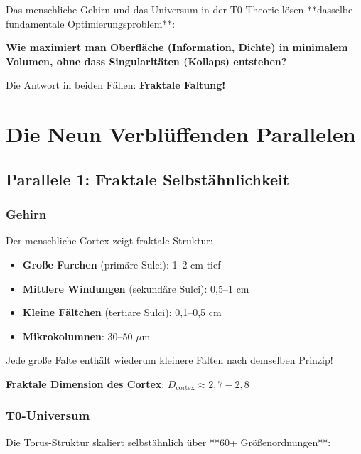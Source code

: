 	\begin{important}
		Das menschliche Gehirn und das Universum in der T0-Theorie lösen **dasselbe fundamentale Optimierungsproblem**:
		
		\vspace{0.3cm}
		
		\textbf{Wie maximiert man Oberfläche (Information, Dichte) in minimalem Volumen, ohne dass Singularitäten (Kollaps) entstehen?}
		
		\vspace{0.3cm}
		
		Die Antwort in beiden Fällen: \textbf{Fraktale Faltung!}
	\end{important}
	
	\section{Die Neun Verblüffenden Parallelen}
	
	\subsection{Parallele 1: Fraktale Selbstähnlichkeit}
	
	\subsubsection{Gehirn}
	
	Der menschliche Cortex zeigt fraktale Struktur:
	\begin{itemize}
		\item \textbf{Große Furchen} (primäre Sulci): 1--2 cm tief
		\item \textbf{Mittlere Windungen} (sekundäre Sulci): 0,5--1 cm
		\item \textbf{Kleine Fältchen} (tertiäre Sulci): 0,1--0,5 cm
		\item \textbf{Mikrokolumnen}: 30--50 $\mu$m
	\end{itemize}
	
	Jede große Falte enthält wiederum kleinere Falten nach demselben Prinzip!
	
	\textbf{Fraktale Dimension des Cortex}: $D_{\text{cortex}} \approx 2,7 - 2,8$
	
	\subsubsection{T0-Universum}
	
	Die Torus-Struktur skaliert selbstähnlich über **60+ Größenordnungen**:
	
